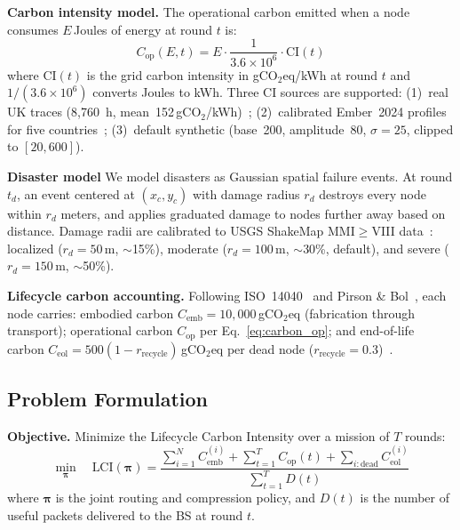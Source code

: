 \documentclass[12pt, onecolumn, journal]{IEEEtran}
\begin{document}
\textbf{Carbon intensity model.}
The operational carbon emitted when a node consumes $E$\,Joules of energy at round $t$ is:
\begin{equation}
    C_{\text{op}}(E, t) = E \cdot \frac{1}{3.6 \times 10^6} \cdot \text{CI}(t)
    \label{eq:carbon_op}
\end{equation}
where $\text{CI}(t)$ is the grid carbon intensity in gCO$_2$eq/kWh at round $t$ and $1/(3.6 \times 10^6)$ converts Joules to kWh.
Three CI sources are supported: (1)~real UK traces (8,760~h, mean~152\,gCO$_2$/kWh)~\cite{uk_carbon_api}; (2)~calibrated Ember~2024 profiles for five countries~\cite{ember2024}; (3)~default synthetic (base~200, amplitude~80, $\sigma{=}25$, clipped to $[20,600]$).

\textbf{Disaster model} 
We model disasters as Gaussian spatial failure events.
At round $t_d$, an event centered at $(x_c, y_c)$ with damage radius $r_d$ destroys every node within $r_d$ meters, and applies graduated damage to nodes further away based on distance.
Damage radii are calibrated to USGS ShakeMap MMI$\geq$VIII data~\cite{usgs_turkey2023, worden2005shakemap}: localized ($r_d{=}50$\,m, $\sim$15\%), moderate ($r_d{=}100$\,m, $\sim$30\%, default), and severe ($r_d{=}150$\,m, $\sim$50\%).

\textbf{Lifecycle carbon accounting.}
Following ISO~14040~\cite{iso14040} and Pirson \& Bol~\cite{pirson2021embodied}, each node carries: embodied carbon $C_{\text{emb}} = 10{,}000$\,gCO$_2$eq (fabrication through transport); operational carbon $C_{\text{op}}$ per Eq.~\eqref{eq:carbon_op}; and end-of-life carbon $C_{\text{eol}} = 500(1 - r_{\text{recycle}})$\,gCO$_2$eq per dead node ($r_{\text{recycle}}{=}0.3$)~\cite{forti2024ewaste}.

\subsection{Problem Formulation}
\label{sec:problem}

\textbf{Objective.}
Minimize the Lifecycle Carbon Intensity over a mission of $T$ rounds:
\begin{equation}
    \min_{\boldsymbol{\pi}} \quad \text{LCI}(\boldsymbol{\pi}) = \frac{\sum_{i=1}^{N} C_{\text{emb}}^{(i)} + \sum_{t=1}^{T} C_{\text{op}}(t) + \sum_{i:\text{dead}} C_{\text{eol}}^{(i)}}{\sum_{t=1}^{T} D(t)}
    \label{eq:lci_formal}
\end{equation}
where $\boldsymbol{\pi}$ is the joint routing and compression policy, and $D(t)$ is the number of useful packets delivered to the BS at round $t$.
\end{document}
